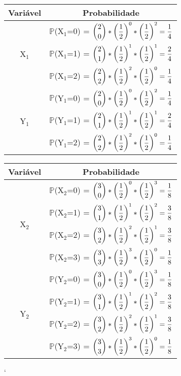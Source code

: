 \documentclass[12pt,a4paper,draft]{article}
\begin{document}
	\begin{center}
		\begin{tabular}{cc}
			Variável & Probabilidade\\ \midrule
			\multirow{3}{*}{X$_{1}$} & $\mathbb{P}$(X$_{1}$=0) = $\dbinom{2}{0} * \left(\dfrac{1}{2}\right)^{0} * \left(\dfrac{1}{2}\right)^{2} = \dfrac{1}{4}$\\ \cmidrule{2-2}
			& $\mathbb{P}$(X$_{1}$=1) = $\dbinom{2}{1} * \left(\dfrac{1}{2}\right)^{1} * \left(\dfrac{1}{2}\right)^{1} = \dfrac{2}{4}$\\ \cmidrule{2-2}
			& $\mathbb{P}$(X$_{1}$=2) = $\dbinom{2}{2} * \left(\dfrac{1}{2}\right)^{2} * \left(\dfrac{1}{2}\right)^{0} = \dfrac{1}{4}$\\ \midrule
			\multirow{3}{*}{Y$_{1}$} & $\mathbb{P}$(Y$_{1}$=0) = $\dbinom{2}{0} * \left(\dfrac{1}{2}\right)^{0} * \left(\dfrac{1}{2}\right)^{2} = \dfrac{1}{4}$\\ \cmidrule{2-2}
			& $\mathbb{P}$(Y$_{1}$=1) = $\dbinom{2}{1} * \left(\dfrac{1}{2}\right)^{1} * \left(\dfrac{1}{2}\right)^{1} = \dfrac{2}{4}$\\ \cmidrule{2-2}
			& $\mathbb{P}$(Y$_{1}$=2) = $\dbinom{2}{2} * \left(\dfrac{1}{2}\right)^{2} * \left(\dfrac{1}{2}\right)^{0} = \dfrac{1}{4}$\\ \midrule
		\end{tabular}
		\vspace{1cm}
		\begin{tabular}{cc}
			Variável & Probabilidade\\ \midrule
			\multirow{4}{*}{X$_{2}$} & $\mathbb{P}$(X$_{2}$=0) = $\dbinom{3}{0} * \left(\dfrac{1}{2}\right)^{0} * \left(\dfrac{1}{2}\right)^{3} = \dfrac{1}{8}$\\ \cmidrule{2-2}
			& $\mathbb{P}$(X$_{2}$=1) = $\dbinom{3}{1} * \left(\dfrac{1}{2}\right)^{1} * \left(\dfrac{1}{2}\right)^{2} = \dfrac{3}{8}$\\ \cmidrule{2-2}
			& $\mathbb{P}$(X$_{2}$=2) = $\dbinom{3}{2} * \left(\dfrac{1}{2}\right)^{2} * \left(\dfrac{1}{2}\right)^{1} = \dfrac{3}{8}$\\ \cmidrule{2-2}
			& $\mathbb{P}$(X$_{2}$=3) = $\dbinom{3}{3} * \left(\dfrac{1}{2}\right)^{3} * \left(\dfrac{1}{2}\right)^{0} = \dfrac{1}{8}$\\ \midrule
			\multirow{4}{*}{Y$_{2}$} & $\mathbb{P}$(Y$_{2}$=0) = $\dbinom{3}{0} * \left(\dfrac{1}{2}\right)^{0} * \left(\dfrac{1}{2}\right)^{3} = \dfrac{1}{8}$\\ \cmidrule{2-2}
			& $\mathbb{P}$(Y$_{2}$=1) = $\dbinom{3}{1} * \left(\dfrac{1}{2}\right)^{1} * \left(\dfrac{1}{2}\right)^{2} = \dfrac{3}{8}$\\ \cmidrule{2-2}
			& $\mathbb{P}$(Y$_{2}$=2) = $\dbinom{3}{2} * \left(\dfrac{1}{2}\right)^{2} * \left(\dfrac{1}{2}\right)^{1} = \dfrac{3}{8}$\\ \cmidrule{2-2}
			& $\mathbb{P}$(Y$_{2}$=3) = $\dbinom{3}{3} * \left(\dfrac{1}{2}\right)^{3} * \left(\dfrac{1}{2}\right)^{0} = \dfrac{1}{8}$\\ \midrule
		\end{tabular}`
	\end{center}
\end{document}
